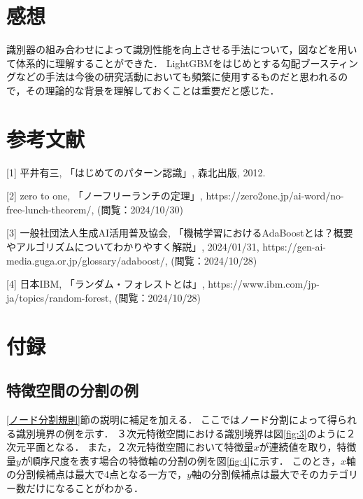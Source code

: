 \documentclass[dvipdfmx]{jreport}
\begin{document}
\section{感想}
識別器の組み合わせによって識別性能を向上させる手法について，図などを用いて体系的に理解することができた．
LightGBMをはじめとする勾配ブースティングなどの手法は今後の研究活動においても頻繁に使用するものだと思われるので，その理論的な背景を理解しておくことは重要だと感じた．

\section{参考文献}

[1] 平井有三, 「はじめてのパターン認識」, 森北出版, 2012.

[2] zero to one, 「ノーフリーランチの定理」, https://zero2one.jp/ai-word/no-free-lunch-theorem/, (閲覧：2024/10/30)

[3] 一般社団法人生成AI活用普及協会, 「機械学習におけるAdaBoostとは？概要やアルゴリズムについてわかりやすく解説」, 2024/01/31, https://gen-ai-media.guga.or.jp/glossary/adaboost/, (閲覧：2024/10/28)

[4] 日本IBM, 「ランダム・フォレストとは」, https://www.ibm.com/jp-ja/topics/random-forest, (閲覧：2024/10/28)

\section{付録}
\subsection{特徴空間の分割の例}
\ref{ノード分割規則}節の説明に補足を加える．
ここではノード分割によって得られる識別境界の例を示す．
３次元特徴空間における識別境界は図\ref{fig:3}のように２次元平面となる．
また，２次元特徴空間において特徴量$x$が連続値を取り，特徴量$y$が順序尺度を表す場合の特徴軸の分割の例を図\ref{fig:4}に示す．
このとき，$x$軸の分割候補点は最大で4点となる一方で，$y$軸の分割候補点は最大でそのカテゴリー数だけになることがわかる．
\end{document}
